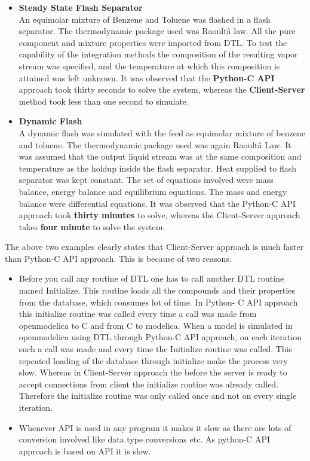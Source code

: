 \documentclass[12pt]{report}
\begin{document}
\begin{itemize}
\item{\textbf{Steady State Flash Separator}} \\
An equimolar mixture of Benzene and Toluene was flashed in a flash separator. The thermodynamic package used was Raoultâ  law. All the pure component and mixture properties were imported from DTL. To test the capability of the integration methods the composition of the resulting vapor stream was specified, and the temperature at which this composition is attained was left unknown. It was observed that the \textbf{Python-C API} approach took thirty seconds to solve the system, whereas the \textbf{Client-Server} method took less than one second to simulate.
\item{\textbf{Dynamic Flash}} \\
A dynamic flash was simulated with the feed as equimolar mixture of benzene and toluene. The thermodynamic package used was again Raoultâ  Law. It was assumed that the output liquid stream was at the same composition and temperature as the holdup inside the flash separator. Heat supplied to flash separator was kept constant. The set of equations involved were mass balance, energy balance and equilibrium equations. The mass and energy balance were differential equations. It was observed that the Python-C API approach took \textbf{thirty minutes} to solve, whereas the Client-Server approach takes \textbf{four minute} to solve the system.
\end{itemize}

The above two examples clearly states that Client-Server approach is much faster than Python-C API approach. This is because of two reasons.

\begin{itemize}
\item {Before you call any routine of DTL one has to call another DTL routine named Initialize. This routine loads all the compounds and their properties from the database, which consumes lot of time. In Python- C API approach this initialize routine was called every time a call was made from openmodelica to C and from C to modelica. When a model is simulated in openmodelica using DTL through Python-C API approach, on each iteration such a call was made and every time the Initialize routine was called. This repeated loading of the database through initialize make the process very slow. Whereas in Client-Server approach the before the server is ready to accept connections from client the initialize routine was already called. Therefore the initialize routine was only called once and not on every single iteration.}
\item{Whenever API is used in any program it makes it slow as there are lots of conversion involved like data type conversions etc. As python-C API approach is based on API it is slow.}
\end{itemize}
\end{document}
